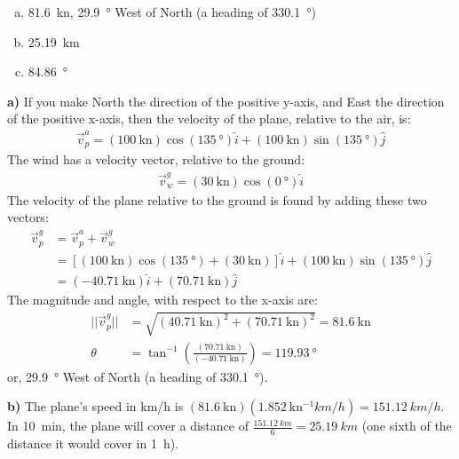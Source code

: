 \begin{finalanswer}
\begin{enumerate}[(a)]
\item \SI{81.6}{\knot}, \SI{29.9}{\degree} West of North (a heading of \SI{330.1}{\degree})
\item \SI{25.19}{km}
\item \SI{84.86}{\degree}
\end{enumerate}
\end{finalanswer}
\begin{solution}
\textbf{a)}
If you make North the direction of the positive y-axis, and East the direction of the positive x-axis, then the velocity of the plane, relative to the air, is:
\begin{align*}
\vec v_p^a = (\SI{100}{\knot})\cos(\SI{135}{\degree})\hat i + (\SI{100}{\knot})\sin(\SI{135}{\degree})\hat j
\end{align*}
The wind has a velocity vector, relative to the ground:
\begin{align*}
\vec v_w^g = (\SI{30}{\knot})\cos(\SI{0}{\degree})\hat i
\end{align*}
The velocity of the plane relative to the ground is found by adding these two vectors:
\begin{align*}
\vec v_p^g &= \vec v_p^a + \vec v_w^g\\
&=[(\SI{100}{\knot})\cos(\SI{135}{\degree})+(\SI{30}{\knot}) ]\hat i + (\SI{100}{\knot})\sin(\SI{135}{\degree})\hat j\\
&= (-\SI{40.71}{\knot})\hat i + (\SI{70.71}{\knot})\hat j
\end{align*}
The magnitude and angle, with respect to the x-axis are:
\begin{align*}
|| \vec v_p^g ||&= \sqrt{(\SI{40.71}{\knot})^2+(\SI{70.71}{\knot})^2} = \SI{81.6}{\knot}\\
\theta &= \tan^{-1}\left(\frac{(\SI{70.71}{\knot})}{(-\SI{40.71}{\knot})}\right) = \SI{119.93}{\degree}
\end{align*}
or, \SI{29.9}{\degree} West of North (a heading of \SI{330.1}{\degree}).

\textbf{b)} The plane's speed in \si{km/h} is $(\SI{81.6}{\knot})(\SI{1.852}{\knot^{-1}km/h})=\SI{151.12}{km/h}$. In \SI{10}{min}, the plane will cover a distance of $\frac{\SI{151.12}{km}}{6}=\SI{25.19}{km}$ (one sixth of the distance it would cover in \SI{1}{\hour}).


\end{solution}

